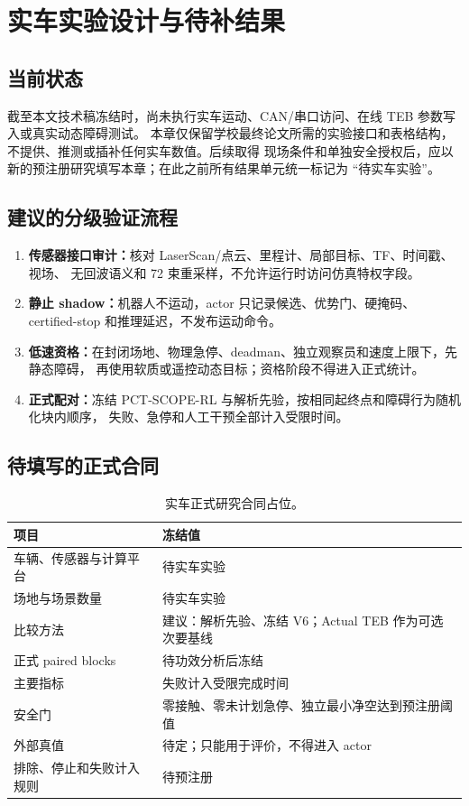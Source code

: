 \chapter{实车实验设计与待补结果}
\label{ch:real-robot-placeholder}

\section{当前状态}
截至本文技术稿冻结时，尚未执行实车运动、CAN/串口访问、在线 TEB 参数写入或真实动态障碍测试。
本章仅保留学校最终论文所需的实验接口和表格结构，不提供、推测或插补任何实车数值。后续取得
现场条件和单独安全授权后，应以新的预注册研究填写本章；在此之前所有结果单元统一标记为
“待实车实验”。

\section{建议的分级验证流程}
\begin{enumerate}
  \item \textbf{传感器接口审计：}核对 LaserScan/点云、里程计、局部目标、TF、时间戳、视场、
  无回波语义和 72 束重采样，不允许运行时访问仿真特权字段。
  \item \textbf{静止 shadow：}机器人不运动，actor 只记录候选、优势门、硬掩码、certified-stop
  和推理延迟，不发布运动命令。
  \item \textbf{低速资格：}在封闭场地、物理急停、deadman、独立观察员和速度上限下，先静态障碍，
  再使用软质或遥控动态目标；资格阶段不得进入正式统计。
  \item \textbf{正式配对：}冻结 PCT-SCOPE-RL 与解析先验，按相同起终点和障碍行为随机化块内顺序，
  失败、急停和人工干预全部计入受限时间。
\end{enumerate}

\section{待填写的正式合同}
\begin{table}[htbp]
\centering
\caption{实车正式研究合同占位。}
\begin{tabularx}{\textwidth}{p{4.2cm}X}
\toprule
项目 & 冻结值\\
\midrule
车辆、传感器与计算平台 & 待实车实验\\
场地与场景数量 & 待实车实验\\
比较方法 & 建议：解析先验、冻结 V6；Actual TEB 作为可选次要基线\\
正式 paired blocks & 待功效分析后冻结\\
主要指标 & 失败计入受限完成时间\\
安全门 & 零接触、零未计划急停、独立最小净空达到预注册阈值\\
外部真值 & 待定；只能用于评价，不得进入 actor\\
排除、停止和失败计入规则 & 待预注册\\
\bottomrule
\end{tabularx}
\end{table}

